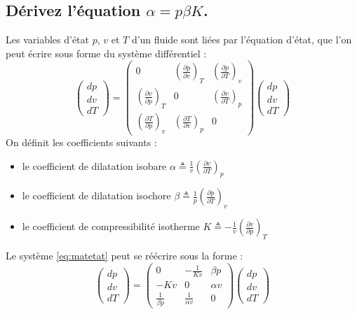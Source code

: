 \subsection{Dérivez l'équation $\alpha = p\beta K$.}
Les variables d'état $p$, $v$ et $T$ d'un fluide sont liées par l'équation d'état, que l'on peut écrire sous forme du système différentiel :
\begin{equation}\begin{pmatrix} dp \\ dv \\ dT \end{pmatrix} = \begin{pmatrix} 0 & \left(\frac{\partial p}{\partial v}\right)_T & \left(\frac{\partial p}{\partial T}\right)_v \\ \left(\frac{\partial v}{\partial p}\right)_T & 0 & \left(\frac{\partial v}{\partial T}\right)_p \\ \left(\frac{\partial T}{\partial p}\right)_v & \left(\frac{\partial T}{\partial v}\right)_p & 0 \end{pmatrix}\begin{pmatrix} dp \\ dv \\ dT \label{eq:matetat}\end{pmatrix}\end{equation}
On définit les coefficients suivants :
\begin{itemize}
	\item le coefficient de dilatation isobare $\alpha \triangleq \frac{1}{v}\left(\frac{\partial v}{\partial T}\right)_p$
	\item le coefficient de dilatation isochore $\beta \triangleq \frac{1}{p}\left(\frac{\partial p}{\partial T}\right)_v$
	\item le coefficient de compressibilité isotherme $K \triangleq -\frac{1}{v}\left(\frac{\partial v}{\partial p}\right)_T$
\end{itemize}
Le système \ref{eq:matetat} peut se réécrire sous la forme :
\begin{equation}\begin{pmatrix} dp \\ dv \\ dT \end{pmatrix} = \begin{pmatrix} 0 & -\frac{1}{Kv} & \beta p \\ -Kv & 0 & \alpha v \\ \frac{1}{\beta p} & \frac{1}{\alpha v} & 0 \end{pmatrix}\begin{pmatrix} dp \\ dv \\ dT \end{pmatrix} \label{eq:fe_matrix}\end{equation}
